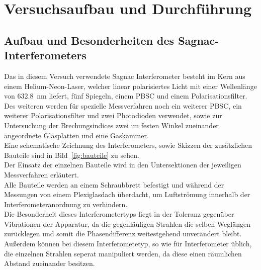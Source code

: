 
\section{Versuchsaufbau und Durchführung}

\subsection{Aufbau und Besonderheiten des Sagnac-Interferometers}
%
Das in diesem Versuch verwendete Sagnac Interferometer besteht im 
Kern aus einem Helium-Neon-Laser, welcher linear polarisiertes 
Licht mit einer Wellenlänge von \SI{632.8}{\nano\metre} liefert, 
fünf Spiegeln, einem PBSC und einem Polarisationsfilter.\\
Des weiteren werden für spezielle Messverfahren noch ein weiterer 
PBSC, ein weiterer Polarisationsfilter und zwei Photodioden 
verwendet, sowie zur Untersuchung der Brechungsindices zwei im 
festen Winkel zueinander angeordnete Glasplatten und eine Gaskammer.\\
Eine schematische Zeichnung des Interferometers, sowie Skizzen der 
zusätzlichen Bauteile sind in Bild~\ref{fig:bauteile} zu sehen.\\
Der Einsatz der einzelnen Bauteile wird in den Untersektionen 
der jeweiligen Messverfahren erläutert.\\
Alle Bauteile werden an einem Schraubbrett befestigt und während 
der Messungen von einem Plexiglasdach überdacht, um Luftströmung 
innerhalb der Interferometeranordnung zu verhindern.\\
Die Besonderheit dieses Interferometertyps liegt in der 
Toleranz gegenüber Vibrationen der Apparatur, da die gegenläufigen 
Strahlen die selben Weglängen zurücklegen und somit die 
Phasendifferenz weitestgehend unverändert bleibt. Außerdem können  
bei diesem Interferometetyp, so wie für Interferometer üblich, die 
einzelnen Strahlen seperat manipuliert werden, da diese einen 
räumlichen Abstand zueinander besitzen.\\
%
%
